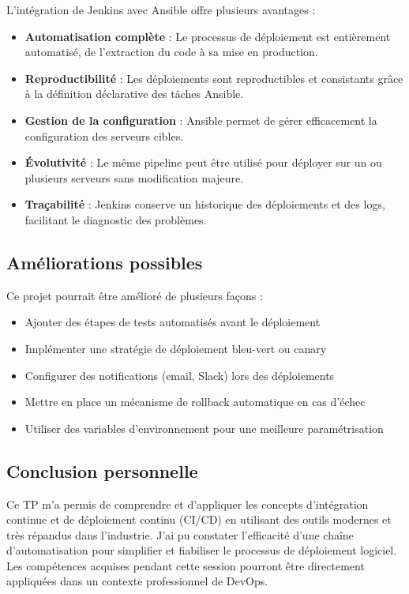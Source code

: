 \documentclass{article}
\begin{document}
L'intégration de Jenkins avec Ansible offre plusieurs avantages :
\begin{itemize}
    \item \textbf{Automatisation complète} : Le processus de déploiement est entièrement automatisé, de l'extraction du code à sa mise en production.
    \item \textbf{Reproductibilité} : Les déploiements sont reproductibles et consistants grâce à la définition déclarative des tâches Ansible.
    \item \textbf{Gestion de la configuration} : Ansible permet de gérer efficacement la configuration des serveurs cibles.
    \item \textbf{Évolutivité} : Le même pipeline peut être utilisé pour déployer sur un ou plusieurs serveurs sans modification majeure.
    \item \textbf{Traçabilité} : Jenkins conserve un historique des déploiements et des logs, facilitant le diagnostic des problèmes.
\end{itemize}

\subsection{Améliorations possibles}

Ce projet pourrait être amélioré de plusieurs façons :
\begin{itemize}
    \item Ajouter des étapes de tests automatisés avant le déploiement
    \item Implémenter une stratégie de déploiement bleu-vert ou canary
    \item Configurer des notifications (email, Slack) lors des déploiements
    \item Mettre en place un mécanisme de rollback automatique en cas d'échec
    \item Utiliser des variables d'environnement pour une meilleure paramétrisation
\end{itemize}

\subsection{Conclusion personnelle}

Ce TP m'a permis de comprendre et d'appliquer les concepts d'intégration continue et de déploiement continu (CI/CD) en utilisant des outils modernes et très répandus dans l'industrie. J'ai pu constater l'efficacité d'une chaîne d'automatisation pour simplifier et fiabiliser le processus de déploiement logiciel. Les compétences acquises pendant cette session pourront être directement appliquées dans un contexte professionnel de DevOps.
\end{document}
